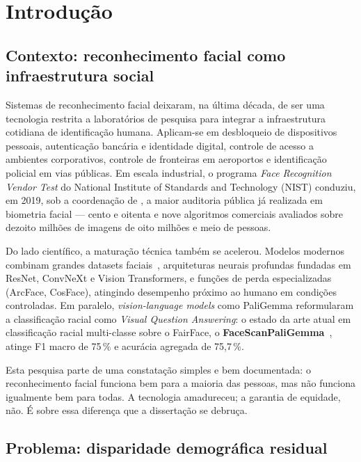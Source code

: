 \section{Introdução}
\label{sec:introducao}

\subsection{Contexto: reconhecimento facial como infraestrutura social}
\label{sec:contexto}

Sistemas de reconhecimento facial deixaram, na última década, de ser uma tecnologia restrita a laboratórios de pesquisa para integrar a infraestrutura cotidiana de identificação humana. Aplicam-se em desbloqueio de dispositivos pessoais, autenticação bancária e identidade digital, controle de acesso a ambientes corporativos, controle de fronteiras em aeroportos e identificação policial em vias públicas. Em escala industrial, o programa \emph{Face Recognition Vendor Test} do National Institute of Standards and Technology (NIST) conduziu, em 2019, sob a coordenação de \textcite{grother2019face}, a maior auditoria pública já realizada em biometria facial --- cento e oitenta e nove algoritmos comerciais avaliados sobre dezoito milhões de imagens de oito milhões e meio de pessoas.

Do lado científico, a maturação técnica também se acelerou. Modelos modernos combinam grandes datasets faciais~\autocite{karkkainen2021fairface,wang2019racial,robinson2020face}, arquiteturas neurais profundas fundadas em ResNet, ConvNeXt e Vision Transformers, e funções de perda especializadas (ArcFace, CosFace), atingindo desempenho próximo ao humano em condições controladas. Em paralelo, \emph{vision-language models} como PaliGemma reformularam a classificação racial como \emph{Visual Question Answering}: o estado da arte atual em classificação racial multi-classe sobre o FairFace, o \textbf{FaceScanPaliGemma}~\autocite{aldahoul2024exploring}, atinge F1 macro de 75\,\% e acurácia agregada de 75,7\,\%.

Esta pesquisa parte de uma constatação simples e bem documentada: o reconhecimento facial funciona bem para a maioria das pessoas, mas não funciona igualmente bem para todas. A tecnologia amadureceu; a garantia de equidade, não. É sobre essa diferença que a dissertação se debruça.

\subsection{Problema: disparidade demográfica residual}
\label{sec:problema}

